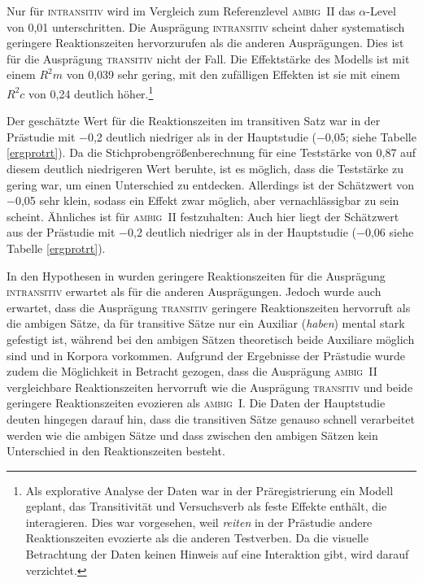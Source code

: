 Nur für \textsc{intransitiv} wird im Vergleich zum Referenzlevel \textsc{ambig~II} das $\alpha$-Level von 0,01 unterschritten. Die Ausprägung \textsc{intransitiv} scheint daher systematisch geringere Reaktions\-zeiten hervorzurufen als die anderen Ausprägungen. Dies ist für die Ausprägung \textsc{transitiv} nicht der Fall. Die Effektstärke des Modells ist mit einem $R^2m$ von 0,039 sehr gering, mit den zufälligen Effekten ist sie mit einem $R^2c$ von 0,24 deutlich höher.\footnote{Als explorative Analyse der Daten war in der Präregistrierung ein Modell geplant, das Transitivität und Versuchsverb als feste Effekte enthält, die interagieren. Dies war vorgesehen, weil \textit{reiten} in der Prästudie andere Reaktionszeiten evozierte als die anderen Testverben. Da die visuelle Betrachtung der Daten keinen Hinweis auf eine Interaktion gibt, wird darauf verzichtet.} 

Der geschätzte Wert für die Reaktionszeiten im transitiven Satz war in der Prästudie mit −0,2 deutlich niedriger als in der Hauptstudie (−0,05; siehe Tabelle \ref{ergprotrt}). Da die Stichprobengrößenberechnung für eine Teststärke von 0,87 auf diesem deutlich niedrigeren Wert beruhte, ist es möglich, dass die Teststärke zu gering war, um einen Unterschied zu entdecken. Allerdings ist der Schätzwert von −0,05 sehr klein, sodass ein Effekt zwar möglich, aber vernachlässigbar zu sein scheint. Ähnliches ist für \textsc{ambig~II} festzuhalten: Auch hier liegt der Schätzwert aus der Prästudie mit −0,2 deutlich niedriger als in der Hauptstudie (−0,06 siehe Tabelle \ref{ergprotrt}).

In den Hypothesen in  wurden geringere Reaktionszeiten für die Ausprägung \textsc{intransitiv} erwartet als für die anderen Ausprägungen. Jedoch wurde auch erwartet, dass die Ausprägung \textsc{transitiv} geringere Reaktionszeiten hervorruft als die ambigen Sätze, da für transitive Sätze nur ein Auxiliar (\textit{haben}) mental stark gefestigt ist, während bei den ambigen Sätzen theoretisch beide Auxiliare möglich sind und in Korpora vorkommen. Aufgrund der Ergebnisse der Prästudie wurde zudem die Möglichkeit in Betracht gezogen, dass die Ausprägung \textsc{ambig~II} vergleichbare Reaktionszeiten hervorruft wie die Ausprägung \textsc{transitiv} und beide geringere Reaktionszeiten evozieren als \textsc{ambig~I}. Die Daten der Hauptstudie deuten hingegen darauf hin, dass die transitiven Sätze genauso schnell verarbeitet werden wie die ambigen Sätze und dass zwischen den ambigen Sätzen kein Unterschied in den Reaktionszeiten besteht. 



